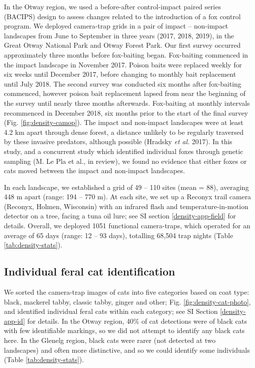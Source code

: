 \documentclass[]{elsarticle} %
\begin{document}
In the Otway region, we used a before-after control-impact paired series (BACIPS) design to assess changes related to the introduction of a fox control program. We deployed camera-trap grids in a pair of impact -- non-impact landscapes from June to September in three years (2017, 2018, 2019), in the Great Otway National Park and Otway Forest Park. Our first survey occurred approximately three months before fox-baiting began. Fox-baiting commenced in the impact landscape in November 2017. Poison baits were replaced weekly for six weeks until December 2017, before changing to monthly bait replacement until July 2018. The second survey was conducted six months after fox-baiting commenced, however poison bait replacement lapsed from near the beginning of the survey until nearly three months afterwards. Fox-baiting at monthly intervals recommenced in December 2018, six months prior to the start of the final survey (Fig. \ref{fig:density-camop}). The impact and non-impact landscapes were at least 4.2 km apart through dense forest, a distance unlikely to be regularly traversed by these invasive predators, although possible (Hradsky \emph{et al.} 2017). In this study, and a concurrent study which identified individual foxes through genetic sampling (M. Le Pla et al., in review), we found no evidence that either foxes or cats moved between the impact and non-impact landscapes.

In each landscape, we established a grid of 49 -- 110 sites (mean = 88), averaging 448 m apart (range: 194 -- 770 m). At each site, we set up a Reconyx trail camera (Reconyx, Holmen, Wisconsin) with an infrared flash and temperature-in-motion detector on a tree, facing a tuna oil lure; see SI section \ref{density-app-field} for details. Overall, we deployed 1051 functional camera-traps, which operated for an average of 65 days (range: 12 -- 93 days), totalling 68,504 trap nights (Table \ref{tab:density-stats}).

\hypertarget{individual-feral-cat-identification}{%
\subsection{Individual feral cat identification}\label{individual-feral-cat-identification}}

We sorted the camera-trap images of cats into five categories based on coat type: black, mackerel tabby, classic tabby, ginger and other; Fig. \ref{fig:density-cat-photo}, and identified individual feral cats within each category; see SI Section \ref{density-app-id} for details. In the Otway region, 40\% of cat detections were of black cats with few identifiable markings, so we did not attempt to identify any black cats here. In the Glenelg region, black cats were rarer (not detected at two landscapes) and often more distinctive, and so we could identify some individuals (Table \ref{tab:density-stats}).
\end{document}
